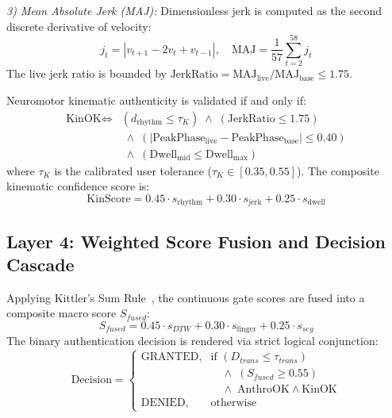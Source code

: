 \documentclass[conference]{IEEEtran}
\begin{document}
\textit{3) Mean Absolute Jerk (MAJ):} Dimensionless jerk is computed as the second discrete derivative of velocity:
\begin{equation}
j_t = |v_{t+1} - 2v_t + v_{t-1}|, \quad \text{MAJ} = \frac{1}{57}\sum_{t=2}^{58} j_t
\end{equation}
The live jerk ratio is bounded by $\text{JerkRatio} = \text{MAJ}_{\text{live}} / \text{MAJ}_{\text{base}} \le 1.75$.

Neuromotor kinematic authenticity is validated if and only if:
\begin{equation}
\begin{split}
\text{KinOK} \iff &(d_{\text{rhythm}} \le \tau_K) \;\wedge\; (\text{JerkRatio} \le 1.75) \\
&\;\wedge\; (|\text{PeakPhase}_{\text{live}} - \text{PeakPhase}_{\text{base}}| \le 0.40) \\
&\;\wedge\; (\text{Dwell}_{\text{mid}} \le \text{Dwell}_{\max})
\end{split}
\label{eq:kin_rule}
\end{equation}
where $\tau_K$ is the calibrated user tolerance ($\tau_K \in [0.35, 0.55]$). The composite kinematic confidence score is:
\begin{equation}
\text{KinScore} = 0.45 \cdot s_{\text{rhythm}} + 0.30 \cdot s_{\text{jerk}} + 0.25 \cdot s_{\text{dwell}}
\end{equation}

\subsection{Layer 4: Weighted Score Fusion and Decision Cascade}

Applying Kittler's Sum Rule~\cite{kittler1998}, the continuous gate scores are fused into a composite macro score $S_{fused}$:
\begin{equation}
S_{fused} = 0.45 \cdot s_{DTW} + 0.30 \cdot s_{\text{finger}} + 0.25 \cdot s_{seg}
\label{eq:score_fusion}
\end{equation}
The binary authentication decision is rendered via strict logical conjunction:
\begin{equation}
\text{Decision} = \begin{cases}
\text{GRANTED}, & \text{if } (D_{trans} \le \tau_{trans}) \\
& \quad \wedge\; (S_{fused} \ge 0.55) \\
& \quad \wedge\; \text{AnthroOK} \wedge \text{KinOK} \\
\text{DENIED}, & \text{otherwise}
\end{cases}
\label{eq:final_decision}
\end{equation}
\end{document}
